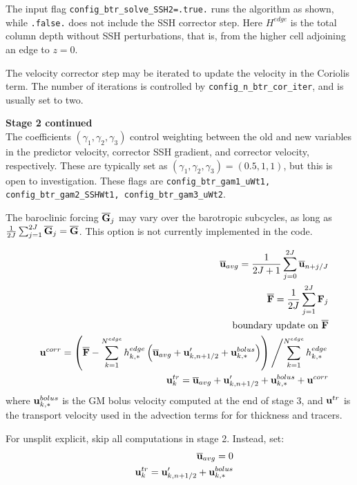 \documentclass[11pt]{report}
\newcommand{\bea}{\begin{eqnarray}}
\newcommand{\eea}{\end{eqnarray}}
\begin{document}
The input flag {\tt config\_btr\_solve\_SSH2=.true.} runs the algorithm as shown, while {\tt .false.} does not include the SSH corrector step.  Here $H^{edge}$ is the total column depth without SSH perturbations, that is, from the higher cell adjoining an edge to $z=0$.

The velocity corrector step may be iterated to update the velocity in the Coriolis term.  The number of iterations is controlled by {\tt config\_n\_btr\_cor\_iter}, and is usually set to two.

\newpage
{\bf Stage 2 continued}\\

The coefficients $(\gamma_1,\gamma_2,\gamma_3)$ control weighting between the old and new variables in the predictor velocity, corrector SSH gradient, and corrector velocity, respectively.  These are typically set as $(\gamma_1,\gamma_2,\gamma_3)=(0.5,1,1)$, but this is open to investigation.  These flags are 
{\tt config\_btr\_gam1\_uWt1, config\_btr\_gam2\_SSHWt1, config\_btr\_gam3\_uWt2}.

The baroclinic forcing ${\overline {\bf G}}_j$ may vary over the barotropic subcycles, as long as 
$\frac{1}{2J}\sum_{j=1}^{2J}{\overline {\bf G}}_j={\overline {\bf G}}$.  This option is not currently implemented in the code.

\begin{eqnarray} &&  
\overline{\bf u}_{avg} = \frac{1}{2J+1} \sum_{j=0}^{2J} \overline{\bf u}_{n+j/J} 
\label{ustar5}\\&&
{\overline {\bf F}} = \frac{1}{2J} \sum_{j=1}^{2J}{\bf F}_j \\&&
\mbox{boundary update on }{\overline {\bf F}}
\\&&
{\bf u}^{corr} = \left( {\overline {\bf F}} 
  - \sum_{k=1}^{N^{edge}} h_{k,*}^{edge} 
   \left( \overline{\bf u}_{avg} + {\bf u}'_{k,n+1/2} + {\bf u}_{k,*}^{bolus}\right) \right)
\left/ \sum_{k=1}^{N^{edge}} h_{k,*}^{edge}   \right. \label{ucorr}
\\ &&
{\bf u}^{tr}_k = \overline{\bf u}_{avg} + {\bf u}'_{k,n+1/2} + {\bf u}_{k,*}^{bolus} + {\bf u}^{corr} \label{utr}
\end{eqnarray}
where ${\bf u}_{k,*}^{bolus}$ is the GM bolus velocity computed at the end of stage 3, and ${\bf u}^{tr}$ is the transport velocity used in the advection terms for for thickness and tracers.

For unsplit explicit, skip all computations in stage 2.  Instead, set:
\bea
&&
\ubtr_{avg} = 0 \\ &&
{\bf u}^{tr}_{k} = {\bf u}'_{k,n+1/2} + {\bf u}_{k,*}^{bolus}
\eea
\end{document}
